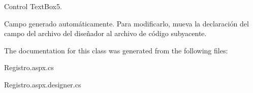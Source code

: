 Control Text\+Box5. 

Campo generado automáticamente. Para modificarlo, mueva la declaración del campo del archivo del diseñador al archivo de código subyacente. 

The documentation for this class was generated from the following files\+:\begin{DoxyCompactItemize}
\item 
Registro.\+aspx.\+cs\item 
Registro.\+aspx.\+designer.\+cs\end{DoxyCompactItemize}
